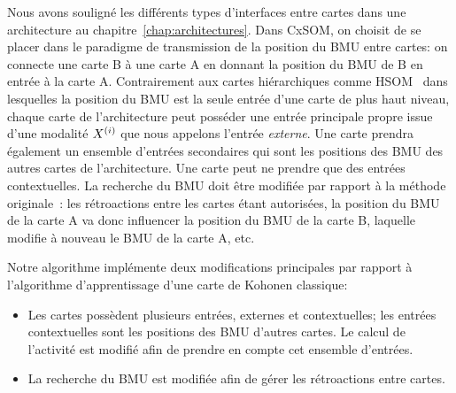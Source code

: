 \documentclass[../main]{subfiles}
\begin{document}
Nous avons souligné les différents types d'interfaces entre cartes dans une architecture au chapitre~\ref{chap:architectures}.
Dans CxSOM, on choisit de se placer dans le paradigme de transmission de la position du BMU entre cartes: on connecte une carte B à une carte A en donnant la position du BMU de B en entrée à la carte A. 
Contrairement aux cartes hiérarchiques comme HSOM~\parencite{lampinen_clustering_1992} dans lesquelles la position du BMU est la seule entrée d'une carte de plus haut niveau, chaque carte de l'architecture peut posséder une entrée principale propre issue d'une modalité $X^{({i})}$ que nous appelons l'entrée \emph{externe}. 
Une carte prendra également un ensemble d'entrées secondaires qui sont les positions des BMU des autres cartes de l'architecture. 
Une carte peut ne prendre que des entrées contextuelles.
La recherche du BMU doit être modifiée par rapport à la méthode originale~: les rétroactions entre les cartes étant autorisées, la position du BMU de la carte A va donc influencer la position du BMU de la carte B, laquelle modifie à nouveau le BMU de la carte A, etc. 

Notre algorithme implémente deux modifications principales par rapport à l'algorithme d'apprentissage d'une carte de Kohonen classique: 
\begin{itemize}
\item Les cartes possèdent plusieurs entrées, externes et contextuelles; les entrées contextuelles sont les positions des BMU d'autres cartes. Le calcul de l'activité est modifié afin de prendre en compte cet ensemble d'entrées.
\item La recherche du BMU est modifiée afin de gérer les rétroactions entre cartes.
\end{itemize}
\end{document}
